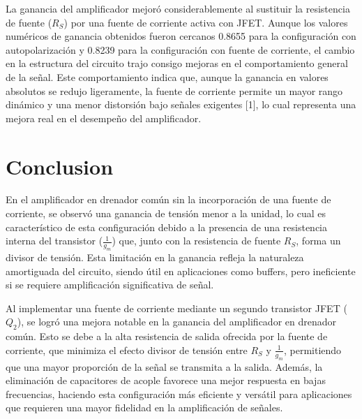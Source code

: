 \documentclass[journal]{IEEEtran}
\begin{document}
\par La ganancia del amplificador mejoró considerablemente al sustituir la resistencia de fuente (\( R_S \)) por una fuente de corriente activa con JFET. Aunque los valores numéricos de ganancia obtenidos fueron cercanos 0.8655 para la configuración con autopolarización y 0.8239 para la configuración con fuente de corriente, el cambio en la estructura del circuito trajo consigo mejoras en el comportamiento general de la señal. Este comportamiento indica que, aunque la ganancia en valores absolutos se redujo ligeramente, la fuente de corriente permite un mayor rango dinámico y una menor distorsión bajo señales exigentes [1], lo cual representa una mejora real en el desempeño del amplificador.

\section{Conclusion}
\par En el amplificador en drenador común sin la incorporación de una fuente de corriente, se observó una ganancia de tensión menor a la unidad, lo cual es característico de esta configuración debido a la presencia de una resistencia interna del transistor ($\frac{1}{g_m}$) que, junto con la resistencia de fuente $R_S$, forma un divisor de tensión. Esta limitación en la ganancia refleja la naturaleza amortiguada del circuito, siendo útil en aplicaciones como buffers, pero ineficiente si se requiere amplificación significativa de señal.
\par Al implementar una fuente de corriente mediante un segundo transistor JFET ($Q_2$), se logró una mejora notable en la ganancia del amplificador en drenador común. Esto se debe a la alta resistencia de salida ofrecida por la fuente de corriente, que minimiza el efecto divisor de tensión entre $R_S$ y $\frac{1}{g_m}$, permitiendo que una mayor proporción de la señal se transmita a la salida. Además, la eliminación de capacitores de acople favorece una mejor respuesta en bajas frecuencias, haciendo esta configuración más eficiente y versátil para aplicaciones que requieren una mayor fidelidad en la amplificación de señales.


\appendices
\end{document}
